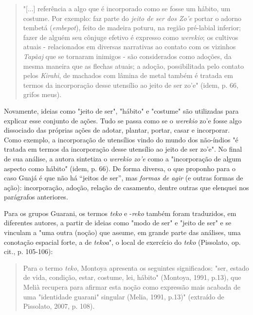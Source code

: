\begin{quote}
"{[}...{]} referência a algo que é incorporado como se fosse um hábito,
um costume. Por exemplo: faz parte do \emph{jeito de ser dos Zo'e}
portar o adorno tembetá (\emph{embepot}), feito de madeira poturu, na
região pré-labial inferior; fazer de alguém seu cônjuge efetivo é
expresso como \emph{werekio}; os cultivos atuais - relacionados em
diversas narrativas ao contato com os vizinhos \emph{Tapãaj} que se
tornaram inimigos - são considerados como adoções, da mesma maneira que
as flechas atuais; a adoção, possibilitada pelo contato pelos
\emph{Kirahi}, de machados com lâmina de metal também é tratada em
termos da incorporação desse utensílio ao jeito de ser zo'e" (idem, p.
66, grifos meus).
\end{quote}

Novamente, ideias como "jeito de ser", "hábito" e "costume" são
utilizadas para explicar esse conjunto de ações. Tudo se passa como se o
\emph{werekio} zo'e fosse algo dissociado das próprias ações de adotar,
plantar, portar, casar e incorporar. Como exemplo, a incorporação de
utensílios vindo do mundo dos não-índios "é tratada em termos da
incorporação desse utensílio ao jeito de ser zo'e". No final de sua
análise, a autora sintetiza o \emph{werekio zo'e} como a "incorporação
de algum aspecto como hábito" (idem, p. 66). De forma diversa, o que
proponho para o caso Guajá é que não há ``jeitos de ser'', mas
\emph{formas de agir} (e outras formas de ação): incorporação, adoção,
relação de casamento, dentre outras que elenquei nos parágrafos
anteriores.

Para os grupos Guarani, os termos \emph{teko} e -\emph{reko} também
foram traduzidos, em diferentes autores, a partir de ideias como "modo
de ser" e "jeito de ser" e se vinculam a "uma outra (noção) que assume,
em grande parte das análises, uma conotação espacial forte, a de
\emph{tekoa}", o local de exercício do \emph{teko} (Pissolato, op. cit.,
p. 105-106):

\begin{quote}
Para o termo \emph{teko}, Montoya apresenta os seguintes significados:
"ser, estado de vida, condição, estar, costume, lei, hábito" (Montoya,
1991, p.13), que Melià recupera para afirmar esta noção como expressão
mais acabada de uma "identidade guarani" singular (Melia, 1991, p.13)"
(extraído de Pissolato, 2007, p. 108).
\end{quote}

